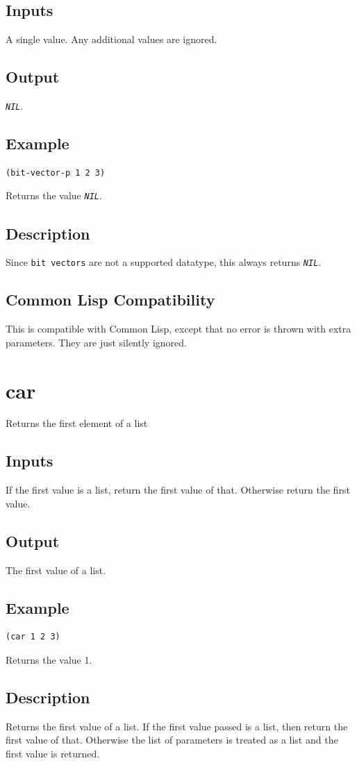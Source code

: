 \documentclass[10pt, openany]{book}
\newcommand{\constant}[1]{\emph{\texttt{#1}}}
\newcommand{\datatype}[1]{\texttt{#1}}
\newcommand{\cl}{Common Lisp}
\begin{document}
\subsection{Inputs}
A single value.  Any additional values are ignored.
\subsection{Output}
\constant{NIL}.
\subsection{Example}
\begin{lstlisting}
(bit-vector-p 1 2 3)
\end{lstlisting}
Returns the value \constant{NIL}.
\subsection{Description}
Since \datatype{bit vectors} are not a supported datatype, this always returns \constant{NIL}.
\subsection{Common Lisp Compatibility}
This is compatible with \cl, except that no error is thrown with extra parameters.  They are just silently ignored.

\section{car}
Returns the first element of a list
\subsection{Inputs}
If the first value is a list, return the first value of that.  Otherwise return the first value.
\subsection{Output}
The first value of a list.
\subsection{Example}
\begin{lstlisting}
(car 1 2 3)
\end{lstlisting}
Returns the value 1.
\subsection{Description}
Returns the first value of a list.  If the first value passed is a list, then return the first value of that.  Otherwise the list of parameters is treated as a list and the first value is returned.
\end{document}
